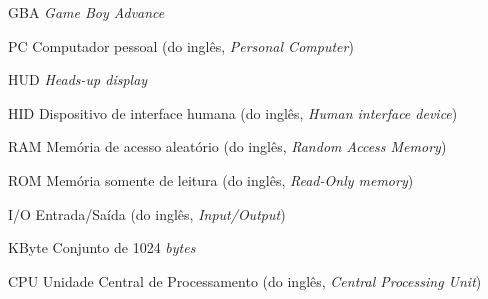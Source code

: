 \begin{siglas}
  \item[GBA] \textit{Game Boy Advance}
  \item[PC] Computador pessoal (do inglês, \textit{Personal Computer})
  \item[HUD] \textit{Heads-up display}
  \item[HID] Dispositivo de interface humana (do inglês, \textit{Human interface device})
  \item[RAM] Memória de acesso aleatório (do inglês, \textit{Random Access Memory})
  \item[ROM] Memória somente de leitura (do inglês, \textit{Read-Only memory})
  \item[I/O] Entrada/Saída (do inglês, \textit{Input/Output})
  \item[KByte] Conjunto de 1024 \textit{bytes}
  \item[CPU] Unidade Central de Processamento (do inglês, \textit{Central Processing Unit})
\end{siglas}
